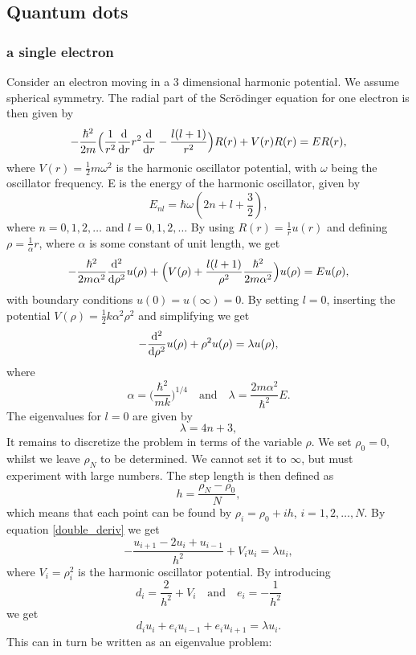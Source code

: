 \documentclass[notitlepage, reprint, nofootinbib]{revtex4-1}
\begin{document}
\subsection{Quantum dots}
\subsubsection{a single electron}
Consider an electron moving in a 3 dimensional harmonic potential. We assume spherical symmetry. The radial part of the Scrödinger equation for one electron is then given by
$$-\frac{\hbar^2}{2m}\Big(\frac{1}{r^2}\dv{r}r^2\dv{r}-\frac{l (l+1) }{r^2}\Big)R(r)+V(r)R(r)=ER(r),$$
where $V(r)=\frac{1}{2}m\omega^2$ is the harmonic oscillator potential, with $\omega$ being the oscillator frequency. E is the energy of the harmonic oscillator, given by 
$$E_{nl}=\hbar \omega(2n+l+\frac{3}{2}),$$
where $n=0,1,2,\dots$ and $l=0,1,2,\dots$ By using $R(r)=\frac{1}{r}u(r)$ and defining $\rho=\frac{1}{\alpha}r$, where $\alpha$ is some constant of unit length, we get 
$$-\frac{\hbar^2}{2m\alpha^2}\dv[2]{\rho}u(\rho)+\Big(V(\rho)+\frac{l(l+1)}{\rho^2}\frac{\hbar^2}{2m\alpha^2}\Big)u(\rho)=Eu(\rho),$$
with boundary conditions $u(0)=u(\infty)=0$. By setting $l=0$, inserting the potential $V(\rho)=\frac{1}{2}k\alpha^2\rho^2$ and simplifying we get
\begin{equation}\label{simple_tusl}-\dv[2]{\rho}u(\rho)+\rho^2u(\rho)=\lambda u(\rho),\end{equation}
where 
\begin{equation}\alpha=\Big(\frac{\hbar^2}{mk}\Big)^{1/4}\quad\text{and}\quad\lambda=\frac{2m\alpha^2}{\hbar^2}E.\end{equation}
The eigenvalues for $l=0$ are given by
\begin{equation}\label{anal_eig}\lambda = 4n+3,\end{equation}
It remains to discretize the problem in terms of the variable $\rho$. We set $\rho_0=0$, whilst we leave $\rho_N$ to be determined. We cannot set it to $\infty$, but must experiment with large numbers. The step length is then defined as 
$$h=\frac{\rho_N-\rho_0}{N},$$
which means that each point can be found by $\rho_i=\rho_0+ih$, $i=1, 2,\dots,N$. By equation \ref{double_deriv} we get
$$-\frac{u_{i+1}-2u_i+u_{i-1}}{h^2}+V_iu_i=\lambda u_i,$$
where $V_i=\rho_i^2$ is the harmonic oscillator potential. By introducing
$$d_i=\frac{2}{h^2}+V_i\quad\text{and}\quad e_i=-\frac{1}{h^2}$$
we get 
$$d_iu_i+e_iu_{i-1}+e_iu_{i+1}=\lambda u_i.$$
This can in turn be written as an eigenvalue problem:
\end{document}
